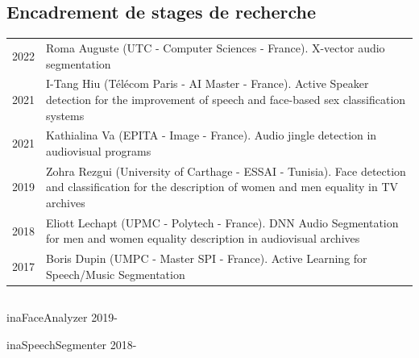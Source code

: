 \begin{fr}
\subsection{Encadrement de stages de recherche}
\begin{tabularx}{\linewidth}{@{}l X@{}}
2022 & Roma Auguste (UTC - Computer Sciences - France). X-vector audio segmentation\\
2021 & I-Tang Hiu (Télécom Paris - AI Master - France). Active Speaker detection for the improvement of speech and face-based sex classification systems\\
2021 & Kathialina Va (EPITA - Image - France). Audio jingle detection in audiovisual programs\\
2019 & Zohra Rezgui (University of Carthage - ESSAI - Tunisia). Face detection and classification for the description of women and men equality in TV archives\\
2018 & Eliott Lechapt (UPMC - Polytech - France). DNN Audio Segmentation for men and women equality description in audiovisual archives\\
2017 & Boris Dupin (UMPC - Master SPI - France). Active Learning for Speech/Music Segmentation\\
\end{tabularx}

\end{fr}


\subsection{\OpenSec}

\begin{jobshort}{inaFaceAnalyzer \OpenMain}{2019-\now}
\end{jobshort}


\begin{jobshort}{inaSpeechSegmenter \OpenMain}{2018-\now}
\end{jobshort}

